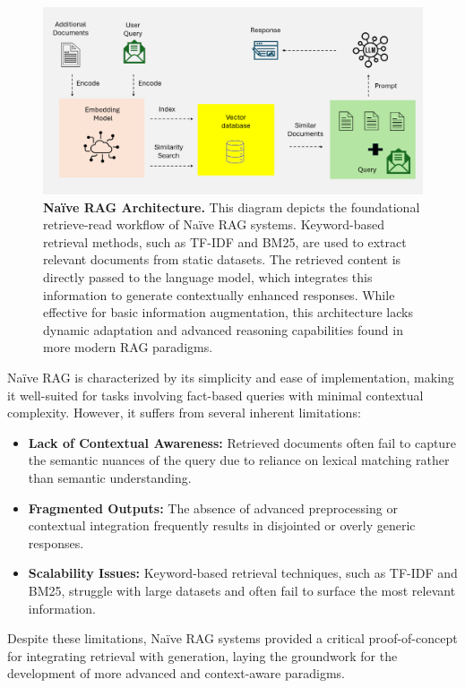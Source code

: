 \begin{figure}[h!]
    \centering
    \includegraphics[width=0.85\linewidth]{images/fig_3.png}
    \vfill
    \caption{
        \textbf{Naïve RAG Architecture.}
        This diagram depicts the foundational retrieve-read workflow of Naïve RAG systems. Keyword-based retrieval methods, such as TF-IDF and BM25, are used to extract relevant documents from static datasets. The retrieved content is directly passed to the language model, which integrates this information to generate contextually enhanced responses. While effective for basic information augmentation, this architecture lacks dynamic adaptation and advanced reasoning capabilities found in more modern RAG paradigms.
    }


    \label{fig:naive_rag_architecture}
\end{figure}

Naïve RAG is characterized by its simplicity and ease of implementation, making it well-suited for tasks involving fact-based queries with minimal contextual complexity. However, it suffers from several inherent limitations:

\begin{itemize}
    \item \textbf{Lack of Contextual Awareness:} Retrieved documents often fail to capture the semantic nuances of the query due to reliance on lexical matching rather than semantic understanding.
    \item \textbf{Fragmented Outputs:} The absence of advanced preprocessing or contextual integration frequently results in disjointed or overly generic responses.
    \item \textbf{Scalability Issues:} Keyword-based retrieval techniques, such as TF-IDF and BM25, struggle with large datasets and often fail to surface the most relevant information.
\end{itemize}

Despite these limitations, Naïve RAG systems provided a critical proof-of-concept for integrating retrieval with generation, laying the groundwork for the development of more advanced and context-aware paradigms.



